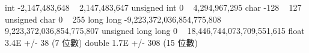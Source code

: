 int                 -2,147,483,648 ~ 2,147,483,647
unsigned int	    0 ~ 4,294,967,295
char                -128 ~ 127
unsigned char       0 ~ 255
long long           -9,223,372,036,854,775,808 ~ 9,223,372,036,854,775,807
unsigned long long  0 ~ 18,446,744,073,709,551,615
float               3.4E +/- 38 (7 位數)
double              1.7E +/- 308 (15 位數)